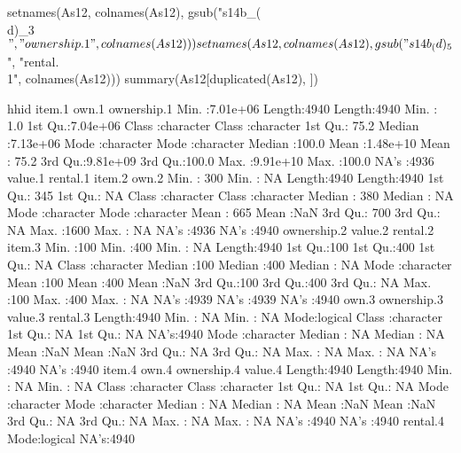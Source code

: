 \begin{Schunk}
\begin{Sinput}
setnames(As12, colnames(As12), 
	gsub("s14b_(\\d)_3$", "ownership.\\1", colnames(As12)))
setnames(As12, colnames(As12), 
	gsub("s14b_(\\d)_5$", "rental.\\1", colnames(As12)))
summary(As12[duplicated(As12), ])
\end{Sinput}
\begin{Soutput}
      hhid             item.1             own.1            ownership.1   
 Min.   :7.01e+06   Length:4940        Length:4940        Min.   :  1.0  
 1st Qu.:7.04e+06   Class :character   Class :character   1st Qu.: 75.2  
 Median :7.13e+06   Mode  :character   Mode  :character   Median :100.0  
 Mean   :1.48e+10                                         Mean   : 75.2  
 3rd Qu.:9.81e+09                                         3rd Qu.:100.0  
 Max.   :9.91e+10                                         Max.   :100.0  
                                                          NA's   :4936   
    value.1        rental.1       item.2             own.2          
 Min.   : 300   Min.   : NA    Length:4940        Length:4940       
 1st Qu.: 345   1st Qu.: NA    Class :character   Class :character  
 Median : 380   Median : NA    Mode  :character   Mode  :character  
 Mean   : 665   Mean   :NaN                                         
 3rd Qu.: 700   3rd Qu.: NA                                         
 Max.   :1600   Max.   : NA                                         
 NA's   :4936   NA's   :4940                                        
  ownership.2      value.2        rental.2       item.3         
 Min.   :100    Min.   :400    Min.   : NA    Length:4940       
 1st Qu.:100    1st Qu.:400    1st Qu.: NA    Class :character  
 Median :100    Median :400    Median : NA    Mode  :character  
 Mean   :100    Mean   :400    Mean   :NaN                      
 3rd Qu.:100    3rd Qu.:400    3rd Qu.: NA                      
 Max.   :100    Max.   :400    Max.   : NA                      
 NA's   :4939   NA's   :4939   NA's   :4940                     
    own.3            ownership.3      value.3     rental.3      
 Length:4940        Min.   : NA    Min.   : NA    Mode:logical  
 Class :character   1st Qu.: NA    1st Qu.: NA    NA's:4940     
 Mode  :character   Median : NA    Median : NA                  
                    Mean   :NaN    Mean   :NaN                  
                    3rd Qu.: NA    3rd Qu.: NA                  
                    Max.   : NA    Max.   : NA                  
                    NA's   :4940   NA's   :4940                 
    item.4             own.4            ownership.4      value.4    
 Length:4940        Length:4940        Min.   : NA    Min.   : NA   
 Class :character   Class :character   1st Qu.: NA    1st Qu.: NA   
 Mode  :character   Mode  :character   Median : NA    Median : NA   
                                       Mean   :NaN    Mean   :NaN   
                                       3rd Qu.: NA    3rd Qu.: NA   
                                       Max.   : NA    Max.   : NA   
                                       NA's   :4940   NA's   :4940  
 rental.4      
 Mode:logical  
 NA's:4940     
               

\end{Soutput}
\end{Schunk}
